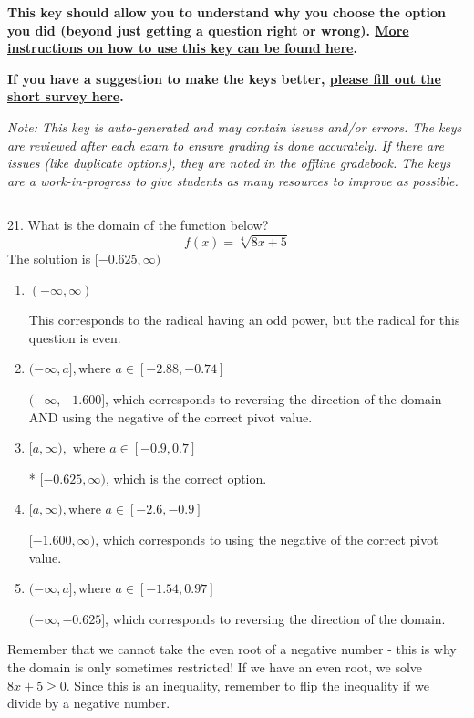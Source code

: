 \documentclass{article}[14pt]
\begin{document}
\textbf{This key should allow you to understand why you choose the option you did (beyond just getting a question right or wrong). \href{https://xronos.clas.ufl.edu/mac1105spring2020/courseDescriptionAndMisc/Exams/LearningFromResults}{More instructions on how to use this key can be found here}.}

\textbf{If you have a suggestion to make the keys better, \href{https://forms.gle/CZkbZmPbC9XALEE88}{please fill out the short survey here}.}

\textit{Note: This key is auto-generated and may contain issues and/or errors. The keys are reviewed after each exam to ensure grading is done accurately. If there are issues (like duplicate options), they are noted in the offline gradebook. The keys are a work-in-progress to give students as many resources to improve as possible.}

\rule{\textwidth}{0.4pt}

21. What is the domain of the function below?
$$ f(x) = \sqrt[4]{8 x + 5} $$ 
The solution is $ [-0.625, \infty) $ 

\begin{enumerate}[label=\Alph*.] 
\item $ (-\infty, \infty) $ 

 This corresponds to the radical having an odd power, but the radical for this question is even. 
\item $ (-\infty, a], \text{where } a \in [-2.88, -0.74] $ 

 $(-\infty, -1.600]$, which corresponds to reversing the direction of the domain AND using the negative of the correct pivot value. 
\item $ [a, \infty), \text{ where } a \in [-0.9, 0.7] $ 

 * $[-0.625, \infty)$, which is the correct option. 
\item $ [a, \infty), \text{where } a \in [-2.6, -0.9] $ 

 $[-1.600, \infty)$, which corresponds to using the negative of the correct pivot value. 
\item $ (-\infty, a], \text{where } a \in [-1.54, 0.97] $ 

  $(-\infty, -0.625]$, which corresponds to reversing the direction of the domain. 
\end{enumerate} 
 
Remember that we cannot take the even root of a negative number - this is why the domain is only sometimes restricted! If we have an even root, we solve $8 x + 5 \geq 0$. Since this is an inequality, remember to flip the inequality if we divide by a negative number.
\end{document}
